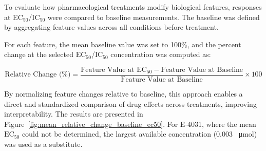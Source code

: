 \documentclass{report}
\begin{document}
        To evaluate how pharmacological treatments modify biological features, responses at \(\text{EC}_{50}\)/\(\text{IC}_{50}\) were compared to baseline measurements. The baseline was defined by aggregating feature values across all conditions before treatment. 

        For each feature, the mean baseline value was set to 100\%, and the percent change at the selected \(\text{EC}_{50}\)/\(\text{IC}_{50}\) concentration was computed as:
        
        \begin{equation}
            \text{Relative Change (\%)} = \frac{\text{Feature Value at EC}_{50}-\text{Feature Value at Baseline}}{\text{Feature Value at Baseline}} \times 100
        \end{equation}
        
       By normalizing feature changes relative to baseline, this approach enables a direct and standardized comparison of drug effects across treatments, improving interpretability. The results are presented in Figure~\ref{fig:mean_relative_change_baseline_ec50}. For E-4031, where the mean \(\text{EC}_{50}\) could not be determined, the largest available concentration (0.003 \SI{}{\umol}) was used as a substitute.
        
\end{document}
